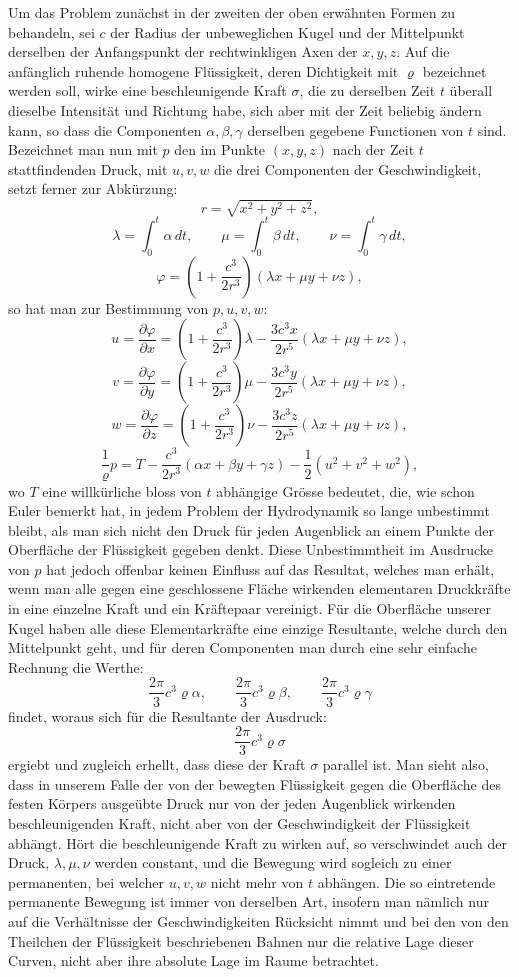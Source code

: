 \documentclass[11pt]{article}
\begin{document}
Um das Problem zunächst in der zweiten der oben erwähnten Formen zu behandeln, sei $c$ der Radius der unbeweglichen Kugel und der Mittelpunkt derselben der Anfangspunkt der rechtwinkligen Axen der $x,y,z$. Auf die anfänglich ruhende homogene Flüssigkeit, deren Dichtigkeit mit $\varrho$ bezeichnet werden soll, wirke eine beschleunigende Kraft $\sigma$, die zu derselben Zeit $t$ überall dieselbe Intensität und Richtung habe, sich aber mit der Zeit beliebig ändern kann, so dass die Componenten $\alpha,\beta,\gamma$ derselben gegebene Functionen von $t$ sind. Bezeichnet man nun mit $p$ den im Punkte $(x,y,z)$ nach der Zeit $t$ stattfindenden Druck, mit $u,v,w$ die drei Componenten der Geschwindigkeit, setzt ferner zur Abkürzung:
\[
 r=\sqrt{x^2+y^2+z^2},
\]
\[
 \lambda=\int_0^t \alpha\,dt,\qquad
 \mu=\int_0^t \beta\,dt,\qquad
 \nu=\int_0^t \gamma\,dt,
\]
\[
 \varphi=\left(1+\frac{c^3}{2r^3}\right)(\lambda x+\mu y+\nu z),
\]
so hat man zur Bestimmung von $p,u,v,w$:
\[
 u=\frac{\partial \varphi}{\partial x}
 =\left(1+\frac{c^3}{2r^3}\right)\lambda
 -\frac{3c^3x}{2r^5}(\lambda x+\mu y+\nu z),
\]
\[
 v=\frac{\partial \varphi}{\partial y}
 =\left(1+\frac{c^3}{2r^3}\right)\mu
 -\frac{3c^3y}{2r^5}(\lambda x+\mu y+\nu z),
\]
\[
 w=\frac{\partial \varphi}{\partial z}
 =\left(1+\frac{c^3}{2r^3}\right)\nu
 -\frac{3c^3z}{2r^5}(\lambda x+\mu y+\nu z),
\]
\[
 \frac1{\varrho}p
 =T-\frac{c^3}{2r^3}(\alpha x+\beta y+\gamma z)-\frac12(u^2+v^2+w^2),
\]
wo $T$ eine willkürliche bloss von $t$ abhängige Grösse bedeutet, die, wie schon Euler bemerkt hat, in jedem Problem der Hydrodynamik so lange unbestimmt bleibt, als man sich nicht den Druck für jeden Augenblick an einem Punkte der Oberfläche der Flüssigkeit gegeben denkt. Diese Unbestimmtheit im Ausdrucke von $p$ hat jedoch offenbar keinen Einfluss auf das Resultat, welches man erhält, wenn man alle gegen eine geschlossene Fläche wirkenden elementaren Druckkräfte in eine einzelne Kraft und ein Kräftepaar vereinigt. Für die Oberfläche unserer Kugel haben alle diese Elementarkräfte eine einzige Resultante, welche durch den Mittelpunkt geht, und für deren Componenten man durch eine sehr einfache Rechnung die Werthe:
\[
 \frac{2\pi}{3}c^3\varrho\alpha,\qquad
 \frac{2\pi}{3}c^3\varrho\beta,\qquad
 \frac{2\pi}{3}c^3\varrho\gamma
\]
findet, woraus sich für die Resultante der Ausdruck:
\[
 \frac{2\pi}{3}c^3\varrho\sigma
\]
ergiebt und zugleich erhellt, dass diese der Kraft $\sigma$ parallel ist. Man sieht also, dass in unserem Falle der von der bewegten Flüssigkeit gegen die Oberfläche des festen Körpers ausgeübte Druck nur von der jeden Augenblick wirkenden beschleunigenden Kraft, nicht aber von der Geschwindigkeit der Flüssigkeit abhängt. Hört die beschleunigende Kraft zu wirken auf, so verschwindet auch der Druck, $\lambda,\mu,\nu$ werden constant, und die Bewegung wird sogleich zu einer permanenten, bei welcher $u,v,w$ nicht mehr von $t$ abhängen. Die so eintretende permanente Bewegung ist immer von derselben Art, insofern man nämlich nur auf die Verhältnisse der Geschwindigkeiten Rücksicht nimmt und bei den von den Theilchen der Flüssigkeit beschriebenen Bahnen nur die relative Lage dieser Curven, nicht aber ihre absolute Lage im Raume betrachtet.
\end{document}
